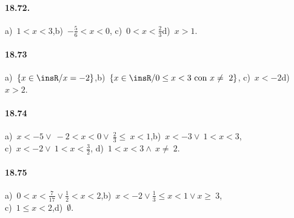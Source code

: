 \paragraph{18.72.} a)~$1<x<3$,\quad b)~$-\frac{5}{6}<x<0$,\quad
c)~$0<x<\frac{2}{3}$\quad d)~$x>1$. %

\paragraph{18.73} a)~$\left\{x\in\insR/x=-2\right\}$,\quad b)~$\left\{x\in \insR/0\le x<3\text{ con }x\neq~2\right\}$,\quad
c)~$x<-2$\quad d)~$x>2$.

\paragraph{18.74} a)~$x<-5\vee~-2<x<0\vee~\frac{2}{3}\le~x<1$,\quad b)~$x<-3\vee~1<x<3$, \protect\\
c)~$x<-2\vee~1<x<\frac{3}{2}$, \quad d)~$1<x<3\wedge~x\neq~2$.

\paragraph{18.75} a)~$0<x<\frac{7}{17}\vee\frac{1}{2}<x<2$,\quad b)~$x<-2\vee \frac{1}{3}\le x<1\vee x\ge~3$,
\protect\\ c)~$1\le x<2$,\quad d)~$\emptyset $.
